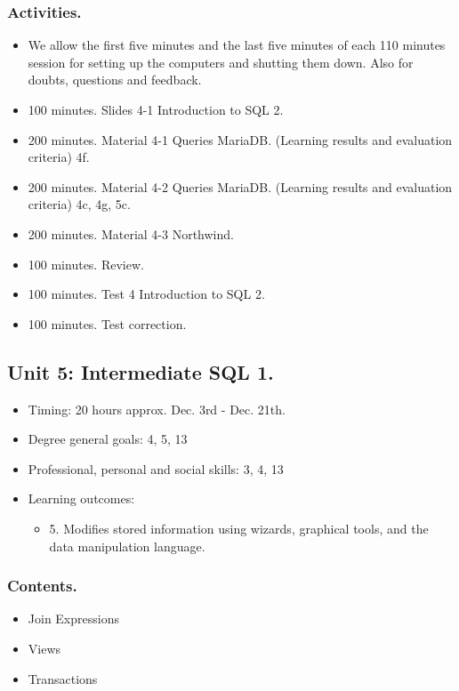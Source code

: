 \documentclass[catalan, a4paper, 12pt, titlepage]{article}
\begin{document}
  \subsubsection{Activities.}

  \begin{itemize}
          \item We allow the first five minutes and the last five minutes of each 110 minutes session for setting up the computers and shutting them down. Also for doubts, questions and feedback.
	  \item 100 minutes. Slides 4-1 Introduction to SQL 2.
	  \item 200 minutes. Material 4-1 Queries MariaDB. (\faGraduationCap Learning results and evaluation criteria) 4f.
	  \item 200 minutes. Material 4-2 Queries MariaDB. (\faGraduationCap Learning results and evaluation criteria) 4c, 4g, 5c.
	  \item 200 minutes. Material 4-3 Northwind.
	  \item 100 minutes. Review.
	  \item 100 minutes. Test 4 Introduction to SQL 2.
	  \item 100 minutes. Test correction.
  \end{itemize}

  \subsection{Unit 5: Intermediate SQL 1.}
  
  \begin{itemize}
	\item Timing: 20 hours approx. Dec. 3rd - Dec. 21th.
	\item Degree general goals: 4, 5, 13
	\item Professional, personal and social skills: 3, 4, 13
	\item Learning outcomes: 
		\begin{itemize}
			\item 5. Modifies stored information using wizards, graphical tools, and the data manipulation language.
		\end{itemize}
  \end{itemize}

  \subsubsection{Contents.}

  \begin{itemize}
	  \item Join Expressions
	  \item Views
	  \item Transactions
  \end{itemize}
\end{document}
